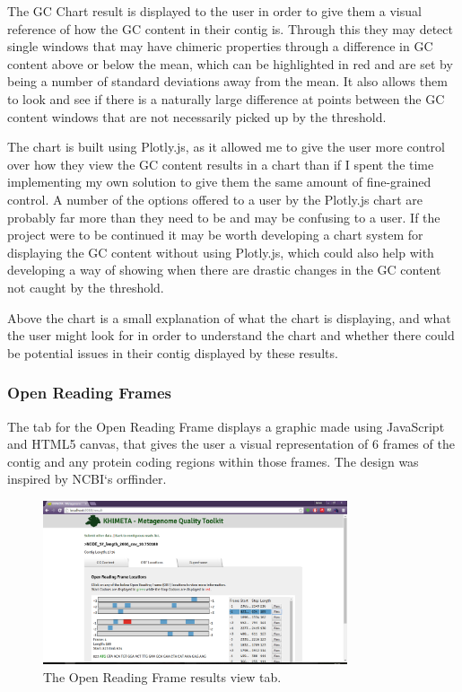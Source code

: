 The GC Chart result is displayed to the user in order to give them a visual reference of how the GC content in their contig is. Through this they may detect single windows that may have chimeric properties through a difference in GC content above or below the mean, which can be highlighted in red and are set by being a number of standard deviations away from the mean. It also allows them to look and see if there is a naturally large difference at points between the GC content windows that are not necessarily picked up by the threshold.

The chart is built using Plotly.js\cite{plotly}, as it allowed me to give the user more control over how they view the GC content results in a chart than if I spent the time implementing my own solution to give them the same amount of fine-grained control. A number of the options offered to a user by the Plotly.js chart are probably far more than they need to be and may be confusing to a user. If the project were to be continued it may be worth developing a chart system for displaying the GC content without using Plotly.js, which could also help with developing a way of showing when there are drastic changes in the GC content not caught by the threshold.

Above the chart is a small explanation of what the chart is displaying, and what the user might look for in order to understand the chart and whether there could be potential issues in their contig displayed by these results.

\subsubsection{Open Reading Frames}
The tab for the Open Reading Frame displays a graphic made using JavaScript and HTML5 canvas, that gives the user a visual representation of 6 frames of the contig and any protein coding regions within those frames. The design was inspired by NCBI`s orffinder\cite{orffinder}.

\begin{figure}[H]
	\centering
\includegraphics[width=0.8\textwidth]{images/ui6}
\caption{The Open Reading Frame results view tab.}
\end{figure}

